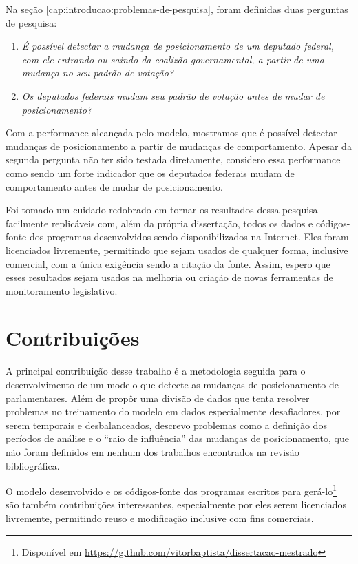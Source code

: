 \documentclass[a4paper,titlepage]{ppgi}\usepackage[]{graphicx}\usepackage[]{color}
\begin{document}
Na seção \ref{cap:introducao:problemas-de-pesquisa}, foram definidas duas
perguntas de pesquisa:

\begin{enumerate}
\item \emph{É possível detectar a mudança de posicionamento de um deputado federal,
com ele entrando ou saindo da coalizão governamental, a partir de uma mudança
no seu padrão de votação?}
\item \emph{Os deputados federais mudam seu padrão de votação antes de mudar de
posicionamento?}
\end{enumerate}

Com a performance alcançada pelo modelo, mostramos que é possível detectar
mudanças de posicionamento a partir de mudanças de comportamento. Apesar da
segunda pergunta não ter sido testada diretamente, considero essa performance
como sendo um forte indicador que os deputados federais mudam de comportamento
antes de mudar de posicionamento.

Foi tomado um cuidado redobrado em tornar os resultados dessa pesquisa
facilmente replicáveis com, além da própria dissertação, todos os dados e
códigos-fonte dos programas desenvolvidos sendo disponibilizados na Internet.
Eles foram licenciados livremente, permitindo que sejam usados de qualquer
forma, inclusive comercial, com a única exigência sendo a citação da fonte.
Assim, espero que esses resultados sejam usados na melhoria ou criação de novas
ferramentas de monitoramento legislativo.

\section{Contribuições}

A principal contribuição desse trabalho é a metodologia seguida para o
desenvolvimento de um modelo que detecte as mudanças de posicionamento de
parlamentares. Além de propôr uma divisão de dados que tenta resolver problemas
no treinamento do modelo em dados especialmente desafiadores, por serem
temporais e desbalanceados, descrevo problemas como a definição dos períodos de
análise e o ``raio de influência'' das mudanças de posicionamento, que não
foram definidos em nenhum dos trabalhos encontrados na revisão bibliográfica.

O modelo desenvolvido e os códigos-fonte dos programas escritos para
gerá-lo\footnote{Disponível em
\url{https://github.com/vitorbaptista/dissertacao-mestrado}} são também
contribuições interessantes, especialmente por eles serem licenciados
livremente, permitindo reuso e modificação inclusive com fins comerciais.
\end{document}
